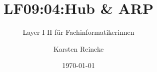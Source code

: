 \documentclass[]{beamer}
\title{LF09:04:Hub \& ARP }
\subtitle{Layer I-II für Fachinformatikerinnen}
\institute{GS-LDK}
\author{Karsten Reincke}
\date{\today}
\def\cfgGl{../../../cfg.gl/}
\begin{document}

\begin{frame}
  \titlepage
\end{frame}






\logo{}
\newpage



%
\end{document}
